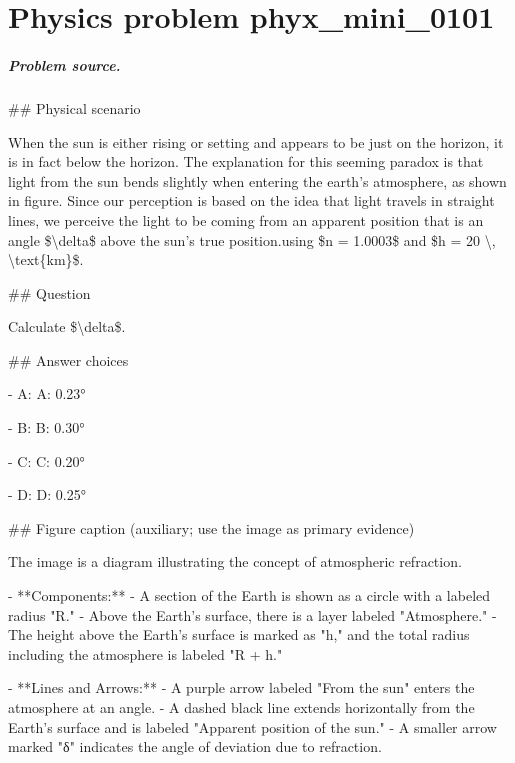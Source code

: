 
\chapter{Physics problem phyx\_mini\_0101}
\label{ch:PhyXMiniProblems_problem_phyx_mini_0101}

\paragraph{Problem source.}
\#\# Physical scenario

When the sun is either rising or setting and appears to be just on the horizon, it is in fact below the horizon. The explanation for this seeming paradox is that light from the sun bends slightly when entering the earth's atmosphere, as shown in figure. Since our perception is based on the idea that light travels in straight lines, we perceive the light to be coming from an apparent position that is an angle \$\textbackslash{}delta\$ above the sun's true position.using \$n = 1.0003\$ and \$h = 20 \textbackslash{}, \textbackslash{}text\{km\}\$.

\#\# Question

Calculate \$\textbackslash{}delta\$.

\#\# Answer choices

- A: A: 0.23°

- B: B: 0.30°

- C: C: 0.20°

- D: D: 0.25°

\#\# Figure caption (auxiliary; use the image as primary evidence)

The image is a diagram illustrating the concept of atmospheric refraction. 

- **Components:**
  - A section of the Earth is shown as a circle with a labeled radius "R."
  - Above the Earth's surface, there is a layer labeled "Atmosphere."
  - The height above the Earth's surface is marked as "h," and the total radius including the atmosphere is labeled "R + h."

- **Lines and Arrows:**
  - A purple arrow labeled "From the sun" enters the atmosphere at an angle.
  - A dashed black line extends horizontally from the Earth's surface and is labeled "Apparent position of the sun."
  - A smaller arrow marked "δ" indicates the angle of deviation due to refraction.

